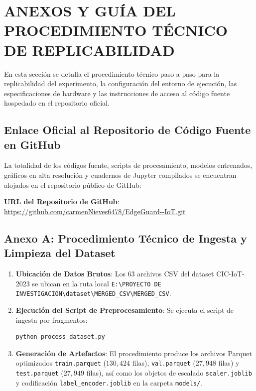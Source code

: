 \section{ANEXOS Y GUÍA DEL PROCEDIMIENTO TÉCNICO DE REPLICABILIDAD}

En esta sección se detalla el procedimiento técnico paso a paso para la replicabilidad del experimento, la configuración del entorno de ejecución, las especificaciones de hardware y las instrucciones de acceso al código fuente hospedado en el repositorio oficial.

\subsection{Enlace Oficial al Repositorio de Código Fuente en GitHub}
La totalidad de los códigos fuente, scripts de procesamiento, modelos entrenados, gráficos en alta resolución y cuadernos de Jupyter compilados se encuentran alojados en el repositorio público de GitHub:
\begin{center}
\textbf{URL del Repositorio de GitHub}: \url{https://github.com/carmenNieves6478/EdgeGuard--IoT.git}
\end{center}

\subsection{Anexo A: Procedimiento Técnico de Ingesta y Limpieza del Dataset}
\begin{enumerate}[leftmargin=*]
    \item \textbf{Ubicación de Datos Brutos}: Los 63 archivos CSV del dataset CIC-IoT-2023 se ubican en la ruta local \texttt{E:\textbackslash PROYECTO DE INVESTIGACION\textbackslash dataset\textbackslash MERGED\_CSV\textbackslash MERGED\_CSV}.
    \item \textbf{Ejecución del Script de Preprocesamiento}: Se ejecuta el script de ingesta por fragmentos:
    \begin{lstlisting}[language=bash]
    python process_dataset.py
    \end{lstlisting}
    \item \textbf{Generación de Artefactos}: El procedimiento produce los archivos Parquet optimizados \texttt{train.parquet} ($130,424$ filas), \texttt{val.parquet} ($27,948$ filas) y \texttt{test.parquet} ($27,949$ filas), así como los objetos de escalado \texttt{scaler.joblib} y codificación \texttt{label\_encoder.joblib} en la carpeta \texttt{models/}.
\end{enumerate}

